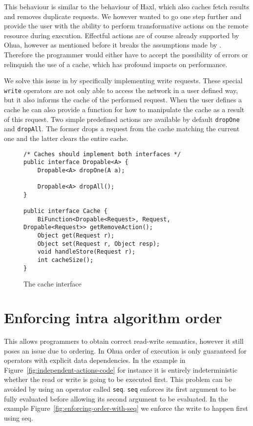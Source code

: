 This behaviour is similar to the behaviour of Haxl, which also caches fetch results and removes duplicate requests.
We however wanted to go one step further and provide the user with the ability to perform transformative actions on the remote resource during execution.
Effectful actions are of course already supported by Ohua, however as mentioned before it breaks the assumptions made by \yauhau{}.
Therefore the programmer would either have to accept the possibility of errors or relinquish the use of a cache, which has profound impacts on performance.

We solve this issue in \yauhau{} by specifically implementing write requests.
These special \texttt{write} operators are not only able to access the network in a user defined way, but it also informs the cache of the performed request.
When the user defines a cache he can also provide a function for how to manipulate the cache as a result of this request.
Two simple predefined actions are available by default \texttt{dropOne} and \texttt{dropAll}.
The former drops a request from the cache matching the current one and the latter clears the entire cache.

\begin{figure}
\begin{verbatim}
/* Caches should implement both interfaces */
public interface Dropable<A> {
    Dropable<A> dropOne(A a);

    Dropable<A> dropAll();
}

public interface Cache {
    BiFunction<Dropable<Request>, Request, Dropable<Request>> getRemoveAction();
    Object get(Request r);
    Object set(Request r, Object resp);
    void handleStore(Request r);
    int cacheSize();
}
\end{verbatim}
\caption{The cache interface}
\label{fig:the-cache-interface}
\end{figure}

\section{Enforcing intra algorithm order}

This allows programmers to obtain correct read-write semantics, however it still poses an issue due to ordering.
In Ohua order of execution is only guaranteed for operators with explicit data dependencies.
In the example in Figure~\ref{fig:independent-actions-code} for instance it is entirely indeterministic whether the read or write is going to be executed first.
This problem can be avoided by using an operator called \texttt{seq}.
\texttt{seq} enforces its first argument to be fully evaluated before allowing its second argument to be evaluated.
In the example Figure~\ref{fig:enforcing-order-with-seq} we enforce the write to happen first using seq.

